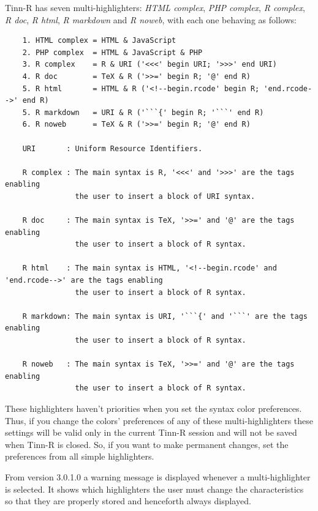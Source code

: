 Tinn-R has seven multi-highlighters: \textit{HTML complex}, \textit{PHP complex},
\textit{R complex}, \textit{R doc},  \textit{R html}, \textit{R markdown} and \textit{R noweb},
with each one behaving as follows:

\begin{footnotesize}
  \begin{verbatim}
    1. HTML complex = HTML & JavaScript
    2. PHP complex  = HTML & JavaScript & PHP
    3. R complex    = R & URI ('<<<' begin URI; '>>>' end URI)
    4. R doc        = TeX & R ('>>=' begin R; '@' end R)
    5. R html       = HTML & R ('<!--begin.rcode' begin R; 'end.rcode-->' end R)
    5. R markdown   = URI & R ('```{' begin R; '```' end R)
    6. R noweb      = TeX & R ('>>=' begin R; '@' end R)

    URI       : Uniform Resource Identifiers.

    R complex : The main syntax is R, '<<<' and '>>>' are the tags enabling
                the user to insert a block of URI syntax.

    R doc     : The main syntax is TeX, '>>=' and '@' are the tags enabling
                the user to insert a block of R syntax.

    R html    : The main syntax is HTML, '<!--begin.rcode' and 'end.rcode-->' are the tags enabling
                the user to insert a block of R syntax.

    R markdown: The main syntax is URI, '```{' and '```' are the tags enabling
                the user to insert a block of R syntax.

    R noweb   : The main syntax is TeX, '>>=' and '@' are the tags enabling
                the user to insert a block of R syntax.

  \end{verbatim}
\end{footnotesize}

These highlighters haven't priorities when you set the syntax color preferences.
Thus, if you change the colors' preferences of any of these multi-highlighters
these settings will be valid only in the current Tinn-R session and will not be
saved when Tinn-R is closed. So, if you want to make permanent changes, set the
preferences from all simple highlighters.

From version 3.0.1.0 a warning message is displayed whenever
a multi-highlighter is selected. It shows which highlighters the user
must change the characteristics so that they are properly stored and
henceforth always displayed.
